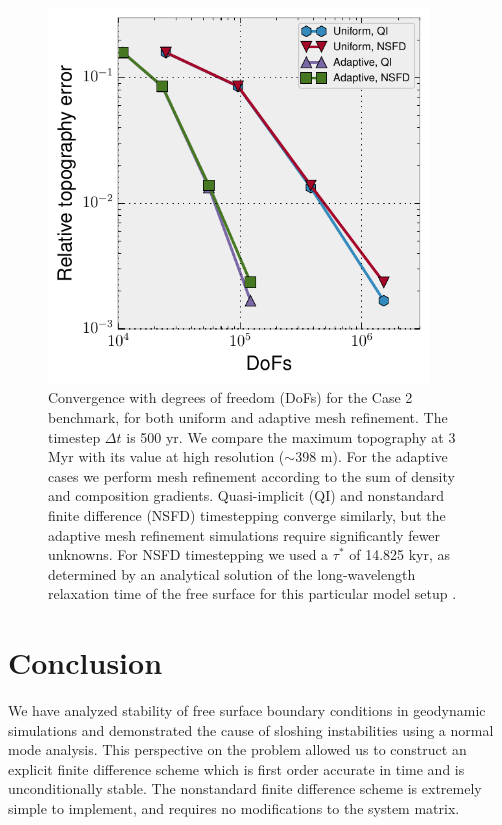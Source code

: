 \documentclass[preprint,12pt,authoryear]{elsarticle}
\begin{document}
\begin{figure}
\includegraphics[width=0.9\textwidth]{figures/amr.pdf}
\caption{Convergence with degrees of freedom (DoFs) for the \citet{crameri2012comparison} Case 2 benchmark, for both uniform and adaptive mesh refinement. The timestep $\Delta t$ is 500 yr. We compare the maximum topography at 3 Myr with its value at high resolution ($\sim$398 m). For the adaptive cases we perform mesh refinement according to the sum of density and composition gradients. Quasi-implicit (QI) and nonstandard finite difference (NSFD) timestepping converge similarly, but the adaptive mesh refinement simulations require significantly fewer unknowns. For NSFD timestepping we used a $\tau^*$ of 14.825 kyr, as determined by an analytical solution of the long-wavelength relaxation time of the free surface for this particular model setup \citep{crameri2012comparison}.}
\label{fig:amr}
\end{figure}

\section{Conclusion}
We have analyzed stability of free surface boundary conditions in geodynamic simulations and 
demonstrated the cause of sloshing instabilities using a normal mode analysis.
This perspective on the problem allowed us to construct an explicit finite difference 
scheme which is first order accurate in time and is unconditionally stable.
The nonstandard finite difference scheme is extremely simple to implement, and 
requires no modifications to the system matrix.
\end{document}
